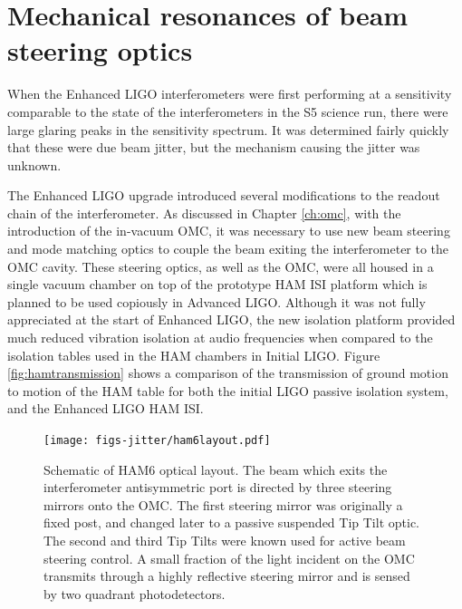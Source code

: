 \section{Mechanical resonances of beam steering optics}
When the Enhanced LIGO interferometers were first performing at a sensitivity comparable to the state of the interferometers in the S5 science run, there were large glaring peaks in the sensitivity spectrum. %
It was determined fairly quickly that these were due beam jitter, but the mechanism causing the jitter was unknown.

The Enhanced LIGO upgrade introduced several modifications to the readout chain of the interferometer. %
As discussed in Chapter \ref{ch:omc}, with the introduction of the in-vacuum OMC, it was necessary to use new beam steering and mode matching optics to couple the beam exiting the interferometer to the OMC cavity. %
These steering optics, as well as the OMC, were all housed in a single vacuum chamber on top of the prototype HAM ISI platform which is planned to be used copiously in Advanced LIGO. %
Although it was not fully appreciated at the start of Enhanced LIGO, the new isolation platform provided much reduced vibration isolation at audio frequencies when compared to the isolation tables used in the HAM chambers in Initial LIGO. %
Figure \ref{fig:hamtransmission} shows a comparison of the transmission of ground motion to motion of the HAM table for both the initial LIGO passive isolation system, and the Enhanced LIGO HAM ISI.

\begin{figure}
  \begin{center}
  \leavevmode
  \texttt{[image: figs-jitter/ham6layout.pdf]}
  \end{center}
  \caption[Schematic of HAM6 optical layout.]{Schematic of HAM6 optical layout. The beam which exits the interferometer antisymmetric port is directed by three steering mirrors onto the OMC. The first steering mirror was originally a fixed post, and changed later to a passive suspended Tip Tilt optic. The second and third Tip Tilts were known used for active beam steering control. A small fraction of the light incident on the OMC transmits through a highly reflective steering mirror and is sensed by two quadrant photodetectors.}
  \label{fig:ham6layout}
\end{figure}

